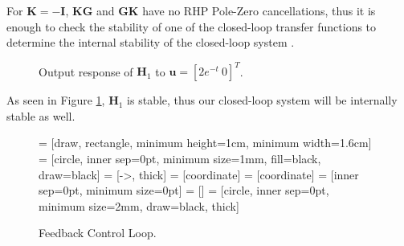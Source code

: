 For $\bm{K} = -\bm{I}$, $\bm{KG}$ and $\bm{GK}$ have no RHP Pole-Zero cancellations, thus it is enough to check the stability of one of the closed-loop transfer functions to determine the internal stability of the closed-loop system \cite{Zho99}.
\begin{figure}[htb]
    \centering
    \begin{tikzpicture}
        
    \end{tikzpicture}
    \caption{Output response of $\bm{H}_1$ to $\bm{u} = \left[2e^{-t}\: 0\right]^T$.}
    \label{Tf1}
\end{figure}
As seen in Figure \ref{Tf1}, $\bm{H}_1$ is stable, thus our closed-loop system will be internally stable as well.

\begin{figure}[htb]
  \centering
       = [draw, rectangle, minimum height=1cm, minimum width=1.6cm]
        = [circle, inner sep=0pt, minimum size=1mm, fill=black, draw=black]
     = [->, thick]
     = [coordinate]
     = [coordinate]
         = [inner sep=0pt, minimum size=0pt]
         = []
           = [circle, inner sep=0pt, minimum size=2mm, draw=black, thick]
	  \caption{Feedback Control Loop.}
    \label{fig:blockDiagram1}
\end{figure}



